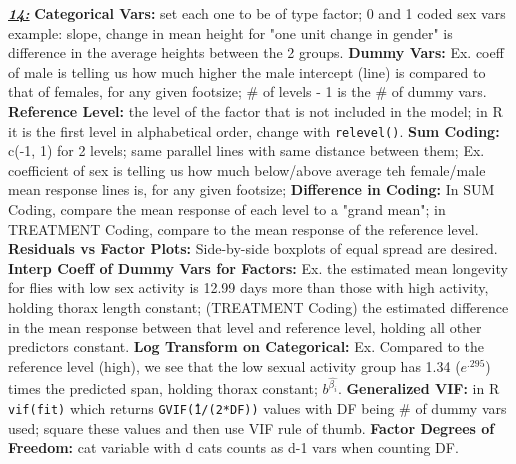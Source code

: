 \documentclass[8pt]{extarticle}
\begin{document}
\textit{\textbf{\underline{14:}}}
\textbf{Categorical Vars:} set each one to be of type factor; 0 and 1 coded 
sex vars example: slope, change in mean height for "one unit change in gender" 
is difference in the average heights between the 2 groups.
\textbf{Dummy Vars:} Ex. coeff of male is telling us how much higher the male 
intercept (line) is compared to that of females, for any given footsize; \# of 
levels - 1 is the \# of dummy vars.
\textbf{Reference Level:} the level of the factor that is not included in the
model; in R it is the first level in alphabetical order, change with 
\texttt{relevel()}.
\textbf{Sum Coding:} c(-1, 1) for 2 levels; same parallel lines with same 
distance between them; Ex. coefficient of sex is telling us how much 
below/above average teh female/male mean response lines is, for any given 
footsize; 
\textbf{Difference in Coding:} In SUM Coding, compare the mean response of each 
level to a "grand mean"; in TREATMENT Coding, compare to the mean response of 
the reference level.
\textbf{Residuals vs Factor Plots:} Side-by-side boxplots of equal spread are 
desired.
\textbf{Interp Coeff of Dummy Vars for Factors:} Ex. the estimated mean 
longevity for flies with low sex activity is 12.99 days more than those with 
high activity, holding thorax length constant; (TREATMENT Coding) the estimated 
difference in the mean response between that level and reference level, holding 
all other predictors constant.
\textbf{Log Transform on Categorical:} Ex. Compared to the reference level 
(high), we see that the low sexual activity group has 1.34 ($e^{.295}$) times 
the predicted span, holding thorax constant; $b^{\hat{\beta_i}}$.
\textbf{Generalized VIF:} in R \texttt{vif(fit)} which returns 
\texttt{GVIF\^(1/(2*DF))} values with DF being \# of dummy vars used; square 
these values and then use VIF rule of thumb.
\textbf{Factor Degrees of Freedom:} cat variable with d cats counts as d-1 vars 
when counting DF.\\
\end{document}
